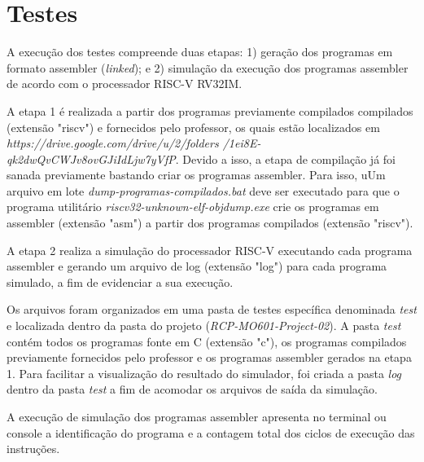 
\section{Testes}

A execução dos testes compreende duas etapas: 1) geração dos programas em formato assembler (\textit{linked}); e 2) simulação da execução dos programas assembler de acordo com o processador RISC-V RV32IM.

A etapa 1 é realizada a partir dos programas previamente compilados compilados (extensão "riscv") e fornecidos pelo professor, os quais estão localizados em \textit{https://drive.google.com/drive/u/2/folders /1ei8E-qk2dwQvCWJv8ovGJiIdLjw7yVfP}. Devido a isso, a etapa de compilação já foi sanada previamente bastando criar os programas assembler. Para isso, uUm arquivo em lote \textit{dump-programas-compilados.bat} deve ser executado para que o programa utilitário \textit{riscv32-unknown-elf-objdump.exe} crie os programas em assembler (extensão "asm") a partir dos programas compilados (extensão "riscv"). 

A etapa 2 realiza a simulação do processador RISC-V executando cada programa assembler e gerando um arquivo de log (extensão "log") para cada programa simulado, a fim de evidenciar a sua execução.

Os arquivos foram organizados em uma pasta de testes específica denominada \textit{test} e localizada dentro da pasta do projeto (\textit{RCP-MO601-Project-02}). A pasta \textit{test} contém todos os programas fonte em C (extensão "c"), os programas compilados previamente fornecidos pelo professor e os programas assembler gerados na etapa 1. Para facilitar a visualização do resultado do simulador, foi criada a pasta \textit{log} dentro da pasta \textit{test} a fim de acomodar os arquivos de saída da simulação.

A execução de simulação dos programas assembler apresenta no terminal ou console a identificação do programa e a contagem total dos ciclos de execução das instruções.
